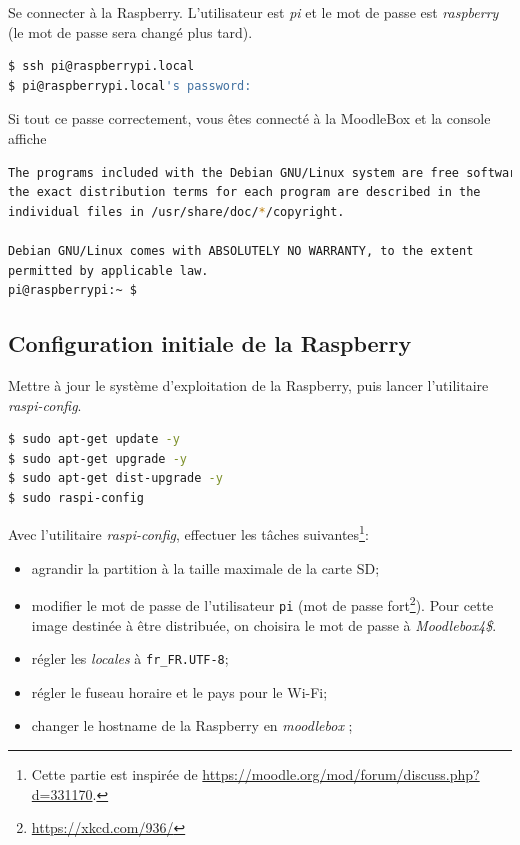 \documentclass[11pt]{article}
\begin{document}
Se connecter à la Raspberry. L'utilisateur est \emph{pi} et le mot de passe est \emph{raspberry} (le mot de passe sera changé plus tard).

\begin{lstlisting}[language=bash]
$ ssh pi@raspberrypi.local
$ pi@raspberrypi.local's password: 
\end{lstlisting}

\begin{verification}
Si tout ce passe correctement, vous êtes connecté à la MoodleBox et la console affiche

\begin{lstlisting}[language=bash]
The programs included with the Debian GNU/Linux system are free software;
the exact distribution terms for each program are described in the
individual files in /usr/share/doc/*/copyright.

Debian GNU/Linux comes with ABSOLUTELY NO WARRANTY, to the extent
permitted by applicable law.
pi@raspberrypi:~ $
\end{lstlisting}
\end{verification}

\subsection{Configuration initiale de la Raspberry}

Mettre à jour le système d'exploitation de la Raspberry, puis lancer l'utilitaire \emph{raspi-config}.

\begin{lstlisting}[language=bash]
$ sudo apt-get update -y
$ sudo apt-get upgrade -y
$ sudo apt-get dist-upgrade -y
$ sudo raspi-config
\end{lstlisting}

Avec l'utilitaire \emph{raspi-config}, effectuer les tâches suivantes\footnote{Cette partie est inspirée de \url{https://moodle.org/mod/forum/discuss.php?d=331170}.}:
\begin{itemize}
\item agrandir la partition à la taille maximale de la carte SD;
\item modifier le mot de passe de l'utilisateur \lstinline{pi} (mot de passe fort\footnote{\url{https://xkcd.com/936/}}). Pour cette image destinée à être distribuée, on choisira le mot de passe à \emph{Moodlebox4\$}.
\item régler les \emph{locales} à \lstinline{fr_FR.UTF-8};
\item régler le fuseau horaire et le pays pour le Wi-Fi;
\item changer le hostname de la Raspberry en \emph{moodlebox} ;
\end{itemize}
\end{document}
